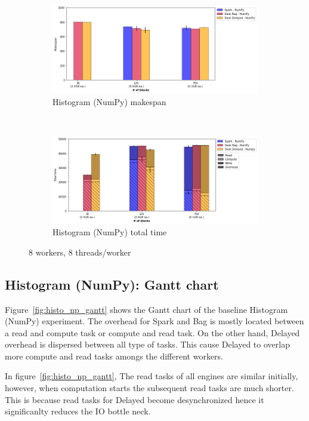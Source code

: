 \documentclass[conference]{IEEEtran}
\begin{document}
\begin{figure}[!t]
    \centering
    \begin{subfigure}[b]{\columnwidth}
        \includegraphics[clip,width=\columnwidth]{images/histo_np_block.png}%
        \caption{Histogram (NumPy) makespan}\label{fig:histo_np_ms_block}
    \end{subfigure}
    \\
    \begin{subfigure}[b]{\columnwidth}
        \includegraphics[clip,width=\columnwidth]{images/histo_idle_np_block.png}%
        \caption{Histogram (NumPy) total time}\label{fig:histo_np_tt_block}
    \end{subfigure}
    \caption{8 workers, 8 threads/worker}
\end{figure}

\subsection{Histogram (NumPy): Gantt chart}
Figure~\ref{fig:histo_np_gantt} shows the Gantt chart of the baseline Histogram
(NumPy) experiment. The overhead for Spark and Bag is mostly located between a read
and compute task or compute and read task. On the other hand, Delayed overhead is
dispersed between all type of tasks. This cause Delayed to overlap more compute and
read tasks amongs the different workers.

In figure~\ref{fig:histo_np_gantt}, The read tasks of all engines are similar initially, however, when computation starts
the subsequent read tasks are much shorter. This is because read tasks for Delayed
become desynchronized hence it significanlty reduces the IO bottle neck.
\end{document}
